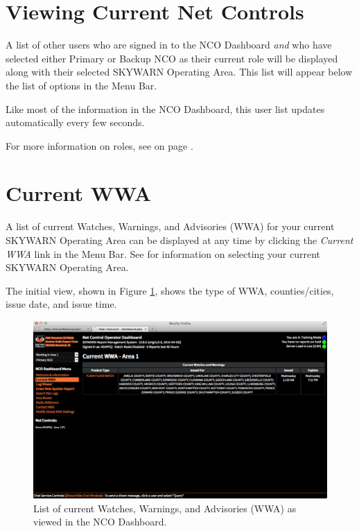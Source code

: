 \documentclass[pdflatex,letterpaper,twoside,12pt]{book}
\begin{document}

\section{Viewing Current Net Controls}\label{dash-view-users}

A list of other users who are signed in to the NCO Dashboard \emph{and} who have selected either Primary or Backup NCO as their current role will be displayed along with their selected SKYWARN Operating Area.  This list will appear below the list of options in the Menu Bar.

Like most of the information in the NCO Dashboard, this user list updates automatically every few seconds.

For more information on roles, see  on page \pageref{dash-set-role}.


\section{Current WWA}\label{dash-current-wwa}

A list of current Watches, Warnings, and Advisories (WWA) for your current SKYWARN Operating Area can be displayed at any time by clicking the \emph{Current WWA} link in the Menu Bar.  See  for information on selecting your current SKYWARN Operating Area.

The initial view, shown in Figure \ref{fig:dash-wwa-list}, shows the type of WWA, counties/cities, issue date, and issue time.

\begin{figure}[t]
  \centering
  \includegraphics[width=\textwidth,keepaspectratio=true]{img/dash-wwa-list}
  \caption{List of current Watches, Warnings, and Advisories (WWA) as viewed in the NCO Dashboard.\label{fig:dash-wwa-list}}
\end{figure}
\end{document}
